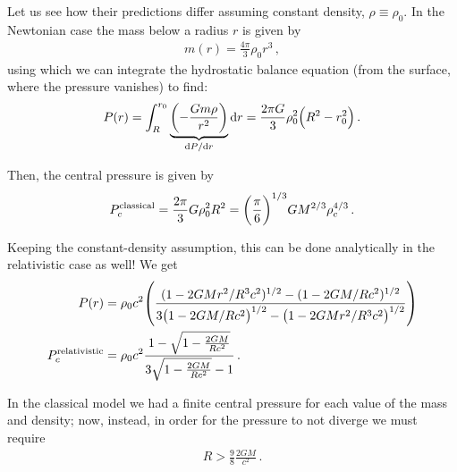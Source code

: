 \documentclass[main.tex]{subfiles}
\begin{document}
Let us see how their predictions differ assuming constant density, \(\rho \equiv \rho_0 \). In the Newtonian case the mass below a radius \(r\) is given by
%
\begin{align}
m(r) = \frac{4 \pi }{3} \rho_0 r^3
\,,
\end{align}
%
using which we can integrate the hydrostatic balance equation (from the surface, where the pressure vanishes) to find:
%
\begin{align}
P(r) 
= \int_{R}^{r_0 } \underbrace{\qty(- \frac{Gm \rho }{r^2})}_{\dv*{P}{r}} \dd{r}
= \frac{2 \pi G}{3}  \rho_0^2 \qty(R^2 - r_0^2)
\,.
\end{align}
%

Then, the central pressure is given by 
%
\begin{align}
P_c^{\text{classical}} = \frac{2 \pi }{3} G \rho_0^2 R^2 = \qty(\frac{\pi }{6})^{1/3} G M^{2/3} \rho_c^{4/3}
\,.
\end{align}

Keeping the constant-density assumption, this can be done analytically in the relativistic case as well! We get 
%
\begin{align}
P(r) &= \rho_0 c^2 \qty(\frac{(1 - 2GM r^2 / R^3 c^2)^{1/2} - (1 - 2GM / Rc^2)^{1/2}}{3 \qty(1 - 2GM / Rc^2)^{1/2} - \qty(1 - 2GM r^2 / R^3c^2)^{1/2}})  \\
P_c^{\text{relativistic}} &= \rho_0 c^2 \frac{1 - \sqrt{1 - \frac{2GM}{Rc^2}}}{3 \sqrt{1 - \frac{2GM}{Rc^2}} - 1}
\,.
\end{align}

%

In the classical model we had a finite central pressure for each value of the mass and density; now, instead, in order for the pressure to not diverge we must require
%
\begin{align}
R > \frac{9}{8} \frac{2GM}{c^2}
\,.
\end{align}
%
\end{document}
